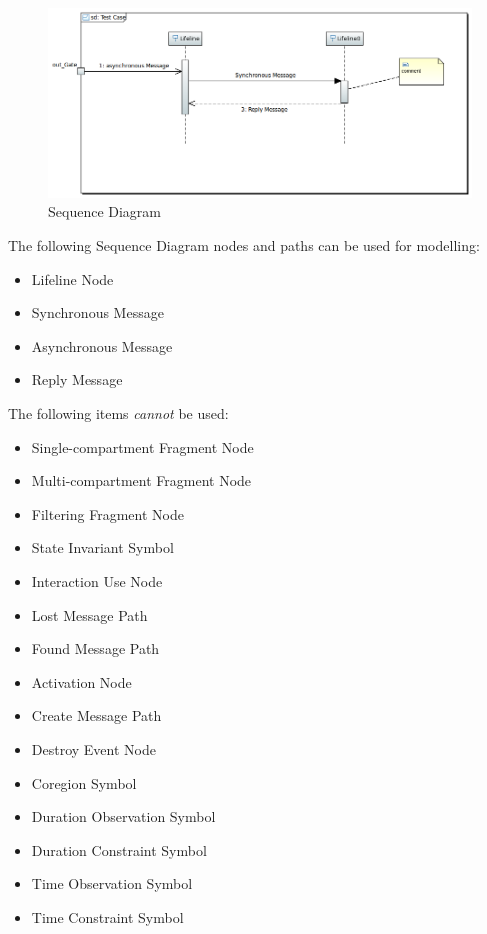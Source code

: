 \begin{figure}[ht]
  \centering
  \includegraphics[width=\textwidth]{images/SequenceDiagram.PNG}
  \caption{Sequence Diagram}
  \label{fig:sd}
\end{figure}


The following Sequence Diagram nodes and paths can be used for
modelling:
\begin{itemize}
\item Lifeline Node 
\item Synchronous Message 
\item Asynchronous Message 
\item Reply Message 
\end{itemize}

The following items \emph{cannot} be used:
\begin{itemize}
\item Single-compartment Fragment Node
\item Multi-compartment Fragment Node
\item Filtering Fragment Node
\item State Invariant Symbol
\item Interaction Use Node
\item Lost Message Path
\item Found Message Path
\item Activation Node
\item Create Message Path
\item Destroy Event Node
\item Coregion Symbol
\item Duration Observation Symbol
\item Duration Constraint Symbol
\item Time Observation Symbol
\item Time Constraint Symbol
\end{itemize}

